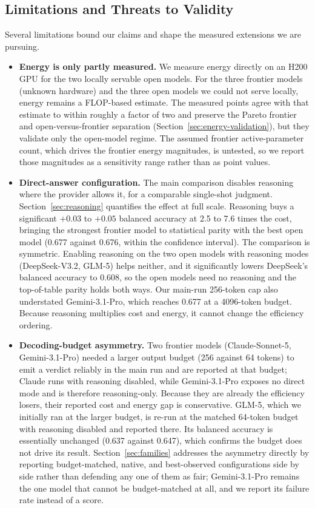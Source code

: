 \documentclass[computers,article,submit,moreauthors]{Definitions/mdpi}
\begin{document}
\subsection{Limitations and Threats to Validity}\label{sec:limits}
Several limitations bound our claims and shape the measured extensions we are pursuing.
\begin{itemize}
\item \textbf{Energy is only partly measured.} We measure energy directly on an H200 GPU for the two locally servable open models. For the three frontier models (unknown hardware) and the three open models we could not serve locally, energy remains a FLOP-based estimate. The measured points agree with that estimate to within roughly a factor of two and preserve the Pareto frontier and open-versus-frontier separation (Section~\ref{sec:energy-validation}), but they validate only the open-model regime. The assumed frontier active-parameter count, which drives the frontier energy magnitudes, is untested, so we report those magnitudes as a sensitivity range rather than as point values.
\item \textbf{Direct-answer configuration.} The main comparison disables reasoning where the provider allows it, for a comparable single-shot judgment. Section~\ref{sec:reasoning} quantifies the effect at full scale. Reasoning buys a significant $+0.03$ to $+0.05$ balanced accuracy at 2.5 to 7.6 times the cost, bringing the strongest frontier model to statistical parity with the best open model (0.677 against 0.676, within the confidence interval). The comparison is symmetric. Enabling reasoning on the two open models with reasoning modes (DeepSeek-V3.2, GLM-5) helps neither, and it significantly lowers DeepSeek's balanced accuracy to 0.608, so the open models need no reasoning and the top-of-table parity holds both ways. Our main-run 256-token cap also understated Gemini-3.1-Pro, which reaches 0.677 at a 4096-token budget. Because reasoning multiplies cost and energy, it cannot change the efficiency ordering.
\item \textbf{Decoding-budget asymmetry.} Two frontier models (Claude-Sonnet-5, Gemini-3.1-Pro) needed a larger output budget (256 against 64 tokens) to emit a verdict reliably in the main run and are reported at that budget; Claude runs with reasoning disabled, while Gemini-3.1-Pro exposes no direct mode and is therefore reasoning-only. Because they are already the efficiency losers, their reported cost and energy gap is conservative. GLM-5, which we initially ran at the larger budget, is re-run at the matched 64-token budget with reasoning disabled and reported there. Its balanced accuracy is essentially unchanged (0.637 against 0.647), which confirms the budget does not drive its result. Section~\ref{sec:families} addresses the asymmetry directly by reporting budget-matched, native, and best-observed configurations side by side rather than defending any one of them as fair; Gemini-3.1-Pro remains the one model that cannot be budget-matched at all, and we report its failure rate instead of a score.

\end{itemize}
\end{document}
